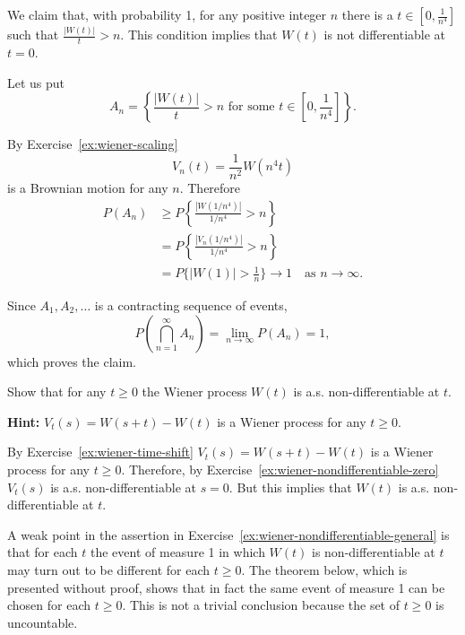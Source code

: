\begin{Solution}
We claim that, with probability 1, for any positive integer $n$ there is a $t \in [0, \frac{1}{n^4}]$ such that $\frac{|W(t)|}{t} > n$. This condition implies that $W(t)$ is not differentiable at $t = 0$.

Let us put
\[
A_n = \left\{\frac{|W(t)|}{t} > n \text{ for some } t \in [0, \frac{1}{n^4}]\right\}.
\]

By Exercise~\ref{ex:wiener-scaling}
\[
V_n(t) = \frac{1}{n^2} W(n^4 t)
\]
is a Brownian motion for any $n$. Therefore
\begin{equation}
\begin{aligned}
P(A_n) &\geq P\left\{\frac{|W(1/n^4)|}{1/n^4} > n\right\} \\
&= P\left\{\frac{|V_n(1/n^4)|}{1/n^4} > n\right\} \\
&= P\{|W(1)| > \frac{1}{n}\} \to 1 \quad \text{as } n \to \infty.
\end{aligned}
\end{equation}

Since $A_1, A_2, \ldots$ is a contracting sequence of events,
\[
P\left(\bigcap_{n=1}^{\infty} A_n\right) = \lim_{n \to \infty} P(A_n) = 1,
\]
which proves the claim.
\end{Solution}

\begin{Exercise}
\label{ex:wiener-nondifferentiable-general}
Show that for any $t \geq 0$ the Wiener process $W(t)$ is a.s. non-differentiable at $t$.

\noindent\textbf{Hint:} $V_t(s) = W(s + t) - W(t)$ is a Wiener process for any $t \geq 0$.
\end{Exercise}

\begin{Solution}
By Exercise~\ref{ex:wiener-time-shift} $V_t(s) = W(s + t) - W(t)$ is a Wiener process for any $t \geq 0$. Therefore, by Exercise~\ref{ex:wiener-nondifferentiable-zero} $V_t(s)$ is a.s. non-differentiable at $s = 0$. But this implies that $W(t)$ is a.s. non-differentiable at $t$.
\end{Solution}

A weak point in the assertion in Exercise~\ref{ex:wiener-nondifferentiable-general} is that for each $t$ the event of measure 1 in which $W(t)$ is non-differentiable at $t$ may turn out to be different for each $t \geq 0$. The theorem below, which is presented without proof, shows that in fact the same event of measure 1 can be chosen for each $t \geq 0$. This is not a trivial conclusion because the set of $t \geq 0$ is uncountable.

